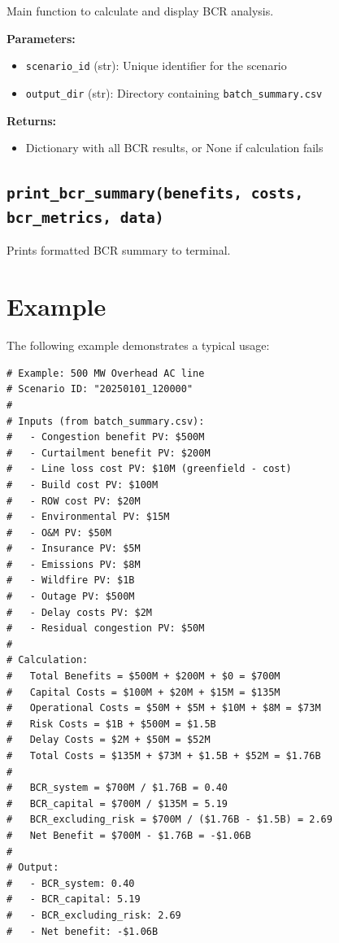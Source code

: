 \documentclass[ctcc_full_documentation.tex]{subfiles}
\begin{document}
Main function to calculate and display BCR analysis.

\textbf{Parameters:}
\begin{itemize}
    \item \texttt{scenario\_id} (str): Unique identifier for the scenario
    \item \texttt{output\_dir} (str): Directory containing \texttt{batch\_summary.csv}
\end{itemize}

\textbf{Returns:}
\begin{itemize}
    \item Dictionary with all BCR results, or None if calculation fails
\end{itemize}

\subsection{\texttt{print\_bcr\_summary(benefits, costs, bcr\_metrics, data)}}

Prints formatted BCR summary to terminal.

\section{Example}

The following example demonstrates a typical usage:

\begin{lstlisting}
# Example: 500 MW Overhead AC line
# Scenario ID: "20250101_120000"
# 
# Inputs (from batch_summary.csv):
#   - Congestion benefit PV: $500M
#   - Curtailment benefit PV: $200M
#   - Line loss cost PV: $10M (greenfield - cost)
#   - Build cost PV: $100M
#   - ROW cost PV: $20M
#   - Environmental PV: $15M
#   - O&M PV: $50M
#   - Insurance PV: $5M
#   - Emissions PV: $8M
#   - Wildfire PV: $1B
#   - Outage PV: $500M
#   - Delay costs PV: $2M
#   - Residual congestion PV: $50M
#
# Calculation:
#   Total Benefits = $500M + $200M + $0 = $700M
#   Capital Costs = $100M + $20M + $15M = $135M
#   Operational Costs = $50M + $5M + $10M + $8M = $73M
#   Risk Costs = $1B + $500M = $1.5B
#   Delay Costs = $2M + $50M = $52M
#   Total Costs = $135M + $73M + $1.5B + $52M = $1.76B
#   
#   BCR_system = $700M / $1.76B = 0.40
#   BCR_capital = $700M / $135M = 5.19
#   BCR_excluding_risk = $700M / ($1.76B - $1.5B) = 2.69
#   Net Benefit = $700M - $1.76B = -$1.06B
#
# Output:
#   - BCR_system: 0.40
#   - BCR_capital: 5.19
#   - BCR_excluding_risk: 2.69
#   - Net benefit: -$1.06B
\end{lstlisting}
\end{document}
